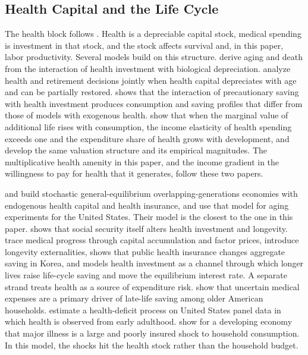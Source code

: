\documentclass[12pt,a4paper]{article}
\begin{document}
\subsection{Health Capital and the Life Cycle}
\label{subsec:lit_longevity}

The health block follows \citet{Grossman1972}. Health is a depreciable capital stock, medical spending is investment in that stock, and the stock affects survival and, in this paper, labor productivity. Several models build on this structure. \citet{DalgaardStrulik2014} derive aging and death from the interaction of health investment with biological depreciation. \citet{KuhnFeichtinger2015} analyze health and retirement decisions jointly when health capital depreciates with age and can be partially restored. \citet{Fioroni2010} shows that the interaction of precautionary saving with health investment produces consumption and saving profiles that differ from those of models with exogenous health. \citet{HallJones2007} show that when the marginal value of additional life rises with consumption, the income elasticity of health spending exceeds one and the expenditure share of health grows with development, and \citet{MurphyTopel2006} develop the same valuation structure and its empirical magnitudes. The multiplicative health amenity in this paper, and the income gradient in the willingness to pay for health that it generates, follow these two papers.

\citet{JungTran2016} and \citet{JungTranChambers2017} build stochastic general-equilibrium overlapping-generations economies with endogenous health capital and health insurance, and \citet{JungTranChambers2017} use that model for aging experiments for the United States. Their model is the closest to the one in this paper. \citet{Zhao2014} shows that social security itself alters health investment and longevity. \citet{FrankovicWrzaczek2020} trace medical progress through capital accumulation and factor prices, \citet{YewZhang2018} introduce longevity externalities, \citet{Lim2020} shows that public health insurance changes aggregate saving in Korea, and \citet{Carrasco2026} models health investment as a channel through which longer lives raise life-cycle saving and move the equilibrium interest rate. A separate strand treats health as a source of expenditure risk. \citet{DeNardi2010} show that uncertain medical expenses are a primary driver of late-life saving among older American households. \citet{HosseiniKopeckyZhao} estimate a health-deficit process on United States panel data in which health is observed from early adulthood. \citet{GertlerGruber2002} show for a developing economy that major illness is a large and poorly insured shock to household consumption. In this model, the shocks hit the health stock rather than the household budget.
\end{document}
